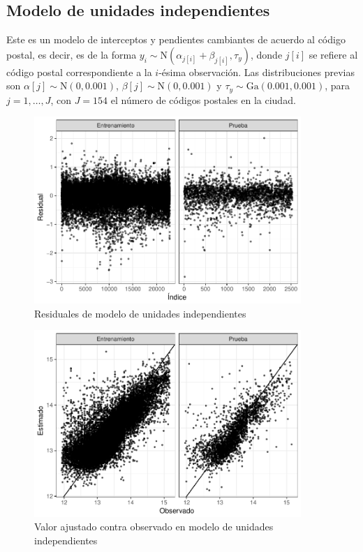 \subsection{Modelo de unidades independientes}

Este es un modelo de interceptos y pendientes cambiantes de acuerdo al código postal, es decir, es de la forma $y_i \sim \mathrm{N}(\alpha_{j[i]} + \beta_{j[i]}, \tau_y)$, donde $j[i]$ se refiere al código postal correspondiente a la $i$-ésima observación. Las distribuciones previas son $\alpha[j] \sim \mathrm{N}(0, 0.001)$, $\beta[j] \sim \mathrm{N}(0, 0.001)$ y $\tau_y \sim \mathrm{Ga}(0.001, 0.001)$, para $j = 1, \hdots, J$, con $J = 154$ el número de códigos postales en la ciudad.

\begin{figure}[H]
    \centering
    \includegraphics[width=0.9\textwidth]{images/no_pooling_resids.pdf}
    \caption{Residuales de modelo de unidades independientes}
    \label{fig:no_pooling_resids}
\end{figure}

\begin{figure}[H]
    \centering
    \includegraphics[width=0.9\textwidth]{images/no_pooling_obs_vs_pred.pdf}
    \caption{Valor ajustado contra observado en modelo de unidades independientes}
    \label{fig:no_pooling_obs_vs_pred}
\end{figure}

